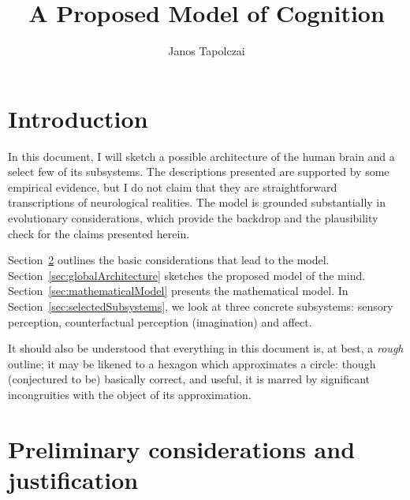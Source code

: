 \documentclass[]{scrartcl}
\title{{\huge A Proposed Model of Cognition}}
\author{Janos Tapolczai}
\theoremstyle{break}
\begin{document}
\maketitle

\begin{abstract}

\end{abstract}

\tableofcontents
\newpage

\section{Introduction}

In this document, I will sketch a possible architecture of the human brain and a select few of its subsystems. The descriptions presented are supported by some empirical evidence, but I do not claim that they are straightforward transcriptions of neurological realities. The model is grounded substantially in evolutionary considerations, which provide the backdrop and the plausibility check for the claims presented herein.

Section~\ref{sec:preliminaries} outlines the basic considerations that lead to the model. Section~\ref{sec:globalArchitecture} sketches the proposed model of the mind. Section~\ref{sec:mathematicalModel} presents the mathematical model. In Section~\ref{sec:selectedSubsystems}, we look at three concrete subsystems: sensory perception, counterfactual perception (imagination) and affect.

It should also be understood that everything in this document is, at best, a {\em rough} outline; it may be likened to a hexagon which approximates a circle: though (conjectured to be) basically correct, and useful, it is marred by significant incongruities with the object of its approximation.

\section{Preliminary considerations and justification}\label{sec:preliminaries}
\end{document}
